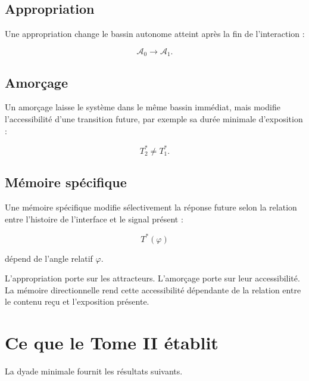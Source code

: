 \section{Appropriation}\label{t2-appropriation-1}

Une appropriation change le bassin autonome atteint après la fin de
l'interaction :

\[
\mathcal A_0
\longrightarrow
\mathcal A_1.
\]

\section{Amorçage}\label{t2-amorcage}

Un amorçage laisse le système dans le même bassin immédiat, mais modifie l'accessibilité d'une transition future, par exemple sa durée minimale d'exposition :

\[
T_2^\ast
\neq
T_1^\ast.
\]

\section{Mémoire spécifique}\label{t2-memoire-specifique}

Une mémoire spécifique modifie sélectivement la réponse future selon la relation entre l'histoire de l'interface et le signal présent :

\[
T^\ast(\varphi)
\]

dépend de l'angle relatif \(\varphi\).

L'appropriation porte sur les attracteurs. L'amorçage porte sur leur accessibilité. La mémoire directionnelle rend cette accessibilité dépendante de la relation entre le contenu reçu et l'exposition présente.

\chapter{Ce que le Tome II établit}\label{t2-ce-que-le-tome-ii-etablit}

La dyade minimale fournit les résultats suivants.

